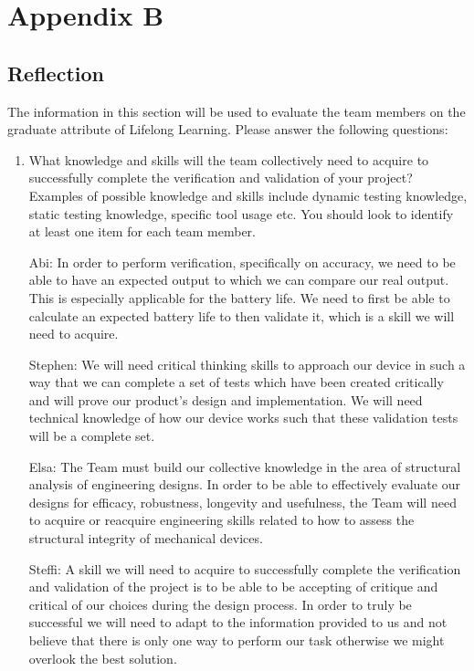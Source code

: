 \documentclass[12pt, titlepage]{article}
\begin{document}
\section{Appendix B}
\subsection{Reflection}

The information in this section will be used to evaluate the team members on the
graduate attribute of Lifelong Learning.  Please answer the following questions:

\begin{enumerate}
  \item What knowledge and skills will the team collectively need to acquire to successfully complete the verification and validation of your project?
  Examples of possible knowledge and skills include dynamic testing knowledge, static testing knowledge, specific tool usage etc.  You should look to identify at least one item for each team member.

Abi: In order to perform verification, specifically on accuracy, we need to be able to have an expected output to which we can compare our real output. This is especially applicable for the battery life. We need to first be able to calculate an expected battery life to then validate it, which is a skill we will need to acquire. 

Stephen: We will need critical thinking skills to approach our device in such a way that we can complete a set of tests which have been created critically and will prove our product's design and implementation. We will need technical knowledge of how our device works such that these validation tests will be a complete set.

Elsa: The Team must build our collective knowledge in the area of structural analysis of engineering designs. In order to be able to effectively evaluate our designs for efficacy, robustness, longevity and usefulness, the Team will need to acquire or reacquire engineering skills related to how to assess the structural integrity of mechanical devices.

Steffi: A skill we will need to acquire to successfully complete the verification and validation of the project is to be able to be accepting of critique and critical of our choices during the design process.  In order to truly be successful we will need to adapt to the information provided to us and not believe that there is only one way to perform our task otherwise we might overlook the best solution.


\end{enumerate}
\end{document}

